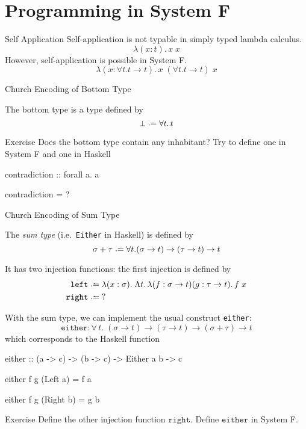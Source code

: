 \section{Programming in System F}
\begin{frame}{Self Application}
Self-application is not typable in simply typed lambda calculus. 
  \[
    \lambda (x : t).\, x\; x
  \]
  However, self-application is possible in System F. 
  \[
    \lambda (x : \forall t. t\to t).\, x\;(\forall t. t\to t)\;x
  \]
  
\end{frame}
\begin{frame}[allowframebreaks]{Church Encoding of Bottom Type}
\begin{definition}
The bottom type is a type defined by
\[
  \bot \defeq \forall t.\,t
\]
\end{definition}
\begin{block}{Exercise}
  Does the bottom type contain any inhabitant? Try to define 
  one in System F and one in Haskell
  \begin{semiverbatim}
    contradiction :: forall a. a

    contradiction = ?
  \end{semiverbatim}
\end{block}
\end{frame}
\begin{frame}[allowframebreaks]{Church Encoding of Sum Type}

\begin{definition}
  The \emph{sum type} (i.e.\ \texttt{Either} in Haskell) is defined by
  \[
    \sigma + \tau \defeq \forall t. (\sigma \to t) \to (\tau \to t) \to t
  \]
\end{definition}
It has two injection functions: the first injection is defined by
\begin{align*}
  \mathtt{left} & \defeq \lambda (x : \sigma).\;\Lambda t.\,\lambda (f : \sigma\to
  t)(g : \tau\to t).\, f\;x \\
  \mathtt{right} & \defeq \;?
\end{align*}
\framebreak

With the sum type, we can implement the usual construct \texttt{either}:
\[
  \mathtt{either} : \forall\,t.\;(\sigma \to t) \to (\tau \to t)
  \to (\sigma + \tau) \to t
\]
which corresponds to the Haskell function
{\small
\begin{semiverbatim}
  either :: (a -> c) -> (b -> c) -> Either a b -> c

  either f g (Left  a) = f a 

  either f g (Right b) = g b
\end{semiverbatim}}

\begin{block}{Exercise}
  Define the other injection function $\mathtt{right}$.  Define
  $\mathtt{either}$ in System F.
\end{block}
\end{frame}

